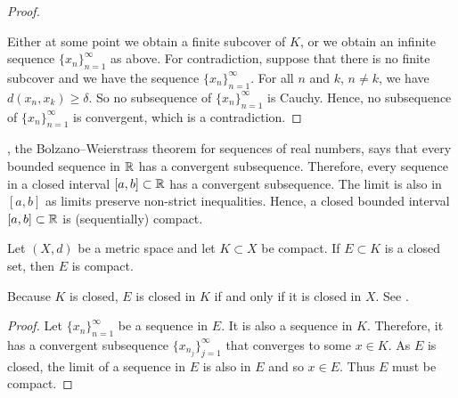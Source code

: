 \begin{proof}
\begin{myfigureht}
\caption{Covering $K$ by $U_{\lambda}$.  The points
$x_1,x_2,x_3,x_4$, 
the three sets 
$U_{\lambda_1}$,
$U_{\lambda_2}$,
$U_{\lambda_3}$,
and 
the first three balls
of radius $\delta$ are drawn.\label{fig:seqcompactiscompact}}
\end{myfigureht}

Either at some point we obtain a finite subcover of $K$,
or we obtain an
infinite
sequence $\{ x_n \}_{n=1}^\infty$ as above.
For contradiction, suppose that
there is no finite subcover and we have the sequence $\{ x_n \}_{n=1}^\infty$.
For all $n$ and $k$, $n \neq k$, 
we have $d(x_n,x_k) \geq \delta$.
So no subsequence of $\{ x_n \}_{n=1}^\infty$ is Cauchy.
Hence, no subsequence of $\{ x_n \}_{n=1}^\infty$ is convergent,
which is a contradiction.
\end{proof}

\begin{example} \label{example:intervalcompact}
,
the Bolzano--Weierstrass theorem for sequences of real numbers,
says that every bounded sequence in ${\mathbb{R}}$ has a convergent
subsequence.  Therefore, every sequence in a closed interval $[a,b] \subset {\mathbb{R}}$ has 
a convergent subsequence.  The limit is also in $[a,b]$ as limits
preserve non-strict inequalities.  Hence, a closed bounded interval $[a,b]
\subset {\mathbb{R}}$ is (sequentially) compact.
\end{example}

\begin{prop} \label{prop:closedsubsetcompact}
Let $(X,d)$ be a metric space and let $K \subset X$ be compact.  If
$E \subset K$ is a closed set, then $E$ is compact.
\end{prop}

Because $K$ is closed, $E$ is closed in $K$ if
and only if it is closed in $X$.
See .

\begin{proof}
Let $\{ x_n \}_{n=1}^\infty$ be a sequence in $E$.  It is also a sequence in $K$.
Therefore, it has a convergent subsequence $\{ x_{n_j} \}_{j=1}^\infty$ that converges to
some $x \in K$.  As $E$ is closed, the limit of a sequence in $E$ is also in $E$
and so $x \in E$.  Thus $E$ must be compact.
\end{proof}

